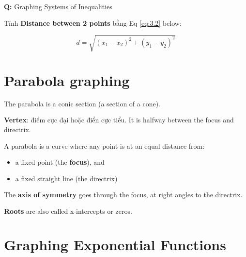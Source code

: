 \textbf{Q: }Graphing Systems of Inequalities

\vspace{5mm}

Tính \textbf{Distance between 2 points} bằng Eq \ref{eq:3.2} below:

\begin{equation}
  d = \sqrt{(x_{1}-x_{2})^{2} + (y_{1}-y_{2})^{2}}
  \label{eq:3.2}
\end{equation}

\vspace{5mm}

\section{Parabola graphing}

The parabola is a conic section (a section of a cone).

\textbf{Vertex}: điểm cực đại hoặc điển cực tiểu. It is halfway between the focus and directrix.

A parabola is a curve where any point is at an equal distance from:
\begin{itemize}
	\item a fixed point (the \textbf{focus}), and
    \item a fixed straight line (the directrix)
\end{itemize}

The \textbf{axis of symmetry} goes through the focus, at right angles to the directrix.

\textbf{Roots} are also called x-intercepts or zeros.

\section{Graphing Exponential Functions}


